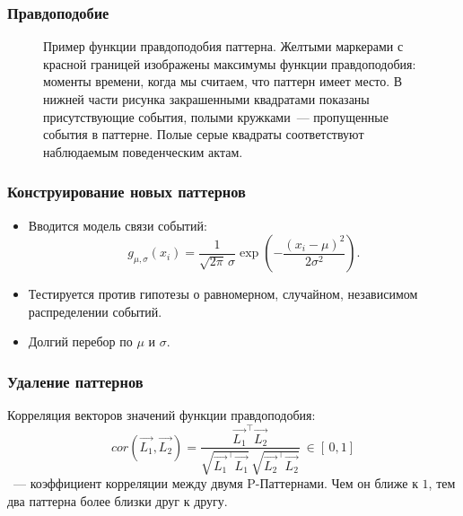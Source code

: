 \documentclass[smaller]{beamer}
\begin{document}
\begin{frame}
\frametitle{Правдоподобие}
\begin{figure}[H]
\noindent{}
\caption{ Пример функции правдоподобия паттерна. Желтыми маркерами с красной границей изображены максимумы функции правдоподобия: 
моменты времени, когда мы считаем, что паттерн имеет место.
В нижней части рисунка закрашенными квадратами показаны присутствующие
события, полыми кружками~--- пропущенные события в паттерне. Полые серые квадраты соответствуют наблюдаемым поведенческим актам.}
\end{figure}
\end{frame}  

\begin{frame}
\frametitle{Конструирование новых паттернов}
\begin{itemize}
 \item Вводится модель связи событий:
$$g_{\mu,\sigma}(x_i)=\frac{1}{\sqrt{2\pi}\,\sigma}\exp\left(- \frac{(x_i-\mu)^2}{2\sigma^2} \right).$$
\item Тестируется против гипотезы о равномерном, случайном, независимом распределении событий.
\item Долгий перебор по $\mu$ и $\sigma$.
\end{itemize}
\end{frame}  

\begin{frame}
\frametitle{Удаление паттернов}
Корреляция векторов значений функции правдоподобия:
$$
cor\left(\overrightarrow{L_1}, \overrightarrow{L_2}\right) = 
\frac{{\overrightarrow{L_1}}^\top \overrightarrow{L_2}}{ 
\sqrt{ {\overrightarrow{L_1}}^\top \overrightarrow{L_1} }\,\sqrt{ {\overrightarrow{L_2}}^\top \overrightarrow{L_2} } }
\:\in[\,0,1]
$$
~--- коэффициент корреляции между двумя P-Паттернами. Чем он ближе к $1$, тем два паттерна 
более близки друг к другу.
\end{frame}  
\end{document}
